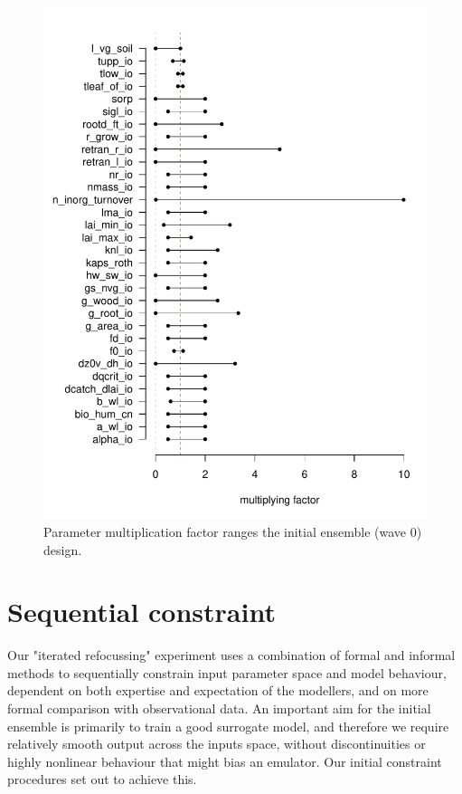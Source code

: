\documentclass[gmd, manuscript]{copernicus}
\begin{document}
\begin{figure}[t]
\includegraphics[width=12cm]{./figs/fig01.pdf}
\caption{Parameter multiplication factor ranges the initial ensemble (wave 0) design.}
\label{fig:lhs_range}
\end{figure}

\section{Sequential constraint}\label{sec:sequential_constraint}

Our "iterated refocussing" experiment uses a combination of formal and informal methods to sequentially constrain input parameter space and model behaviour, dependent on both expertise and expectation of the modellers, and on more formal comparison with observational data. An important aim for the initial ensemble is primarily to train a good surrogate model, and therefore we require relatively smooth output across the inputs space, without discontinuities or highly nonlinear behaviour that might bias an emulator. Our initial constraint procedures set out to achieve this.
\end{document}
